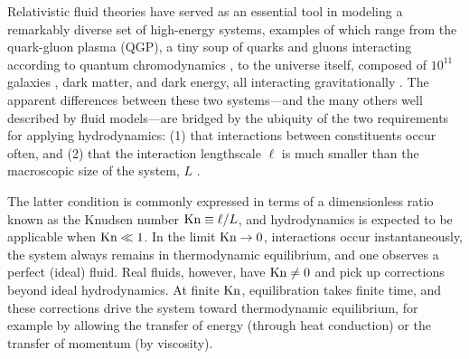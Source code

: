 \documentclass[%
notitlepage,
superscriptaddress,
nofootinbib,
amsmath,
amssymb,
aps,
twocolumn
]{revtex4-1}
\newcommand{\Kn}{\textnormal{Kn}}
\begin{document}
Relativistic fluid theories have served as an essential tool in modeling a
remarkably diverse set of high-energy systems, examples of which range from
the quark-gluon plasma (QGP), a tiny soup of quarks and
gluons interacting
according to quantum chromodynamics \cite{Teaney:2009qa}, to the universe
itself, composed of $10^{11}$ galaxies \cite{Lauer2021}, dark matter, and
dark energy, all interacting gravitationally \cite{Andersson:2020phh}.  The
apparent differences between these two systems---and the many others well
described by fluid models---are bridged by the ubiquity of the two
requirements for applying hydrodynamics: (1) that interactions between
constituents occur often, and (2) that the interaction lengthscale $\ell$
is much smaller than the macroscopic size of the system, $L$
\cite{Rezzolla2013}.

The latter condition is commonly expressed in terms of a dimensionless
ratio known as the Knudsen number ${\Kn \equiv \ell/L}$, and hydrodynamics
is expected to be applicable when $\Kn \ll 1$.  In the limit $\Kn \to 0$,
interactions occur instantaneously, the system always remains in
thermodynamic equilibrium, and one observes a perfect (ideal) fluid. Real
fluids, however, have $\Kn \neq 0$ and pick up corrections beyond ideal
hydrodynamics.  At finite $\Kn$, equilibration takes finite time, and these
corrections drive the system toward thermodynamic equilibrium, for example
by allowing the transfer of energy (through heat conduction) or the
transfer of momentum (by viscosity).
\end{document}
